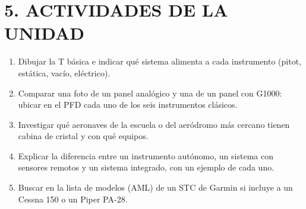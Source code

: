 \section*{5. ACTIVIDADES DE LA UNIDAD}
\begin{enumerate}
  \item Dibujar la T básica e indicar qué sistema alimenta a cada instrumento (pitot, estática,
        vacío, eléctrico).
  \item Comparar una foto de un panel analógico y una de un panel con G1000: ubicar en el PFD cada
        uno de los seis instrumentos clásicos.
  \item Investigar qué aeronaves de la escuela o del aeródromo más cercano tienen cabina de
        cristal y con qué equipos.
  \item Explicar la diferencia entre un instrumento autónomo, un sistema con sensores remotos y un
        sistema integrado, con un ejemplo de cada uno.
  \item Buscar en la lista de modelos (AML) de un STC de Garmin si incluye a un Cessna 150 o un
        Piper PA-28.
\end{enumerate}
